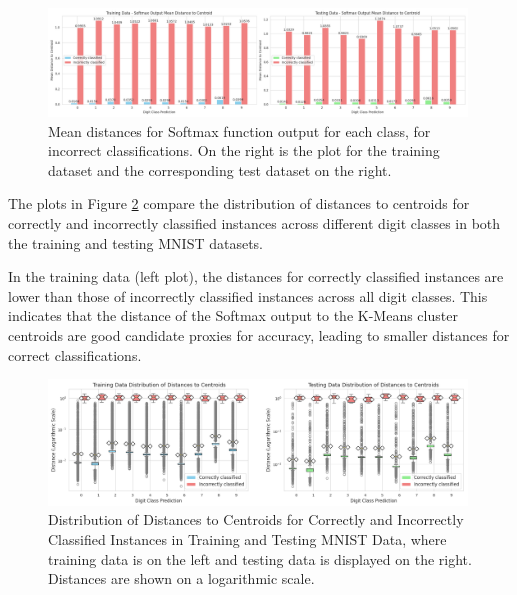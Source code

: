\begin{figure}[h]
    \centering
    \includegraphics[width=0.99\textwidth]{Figures/Methods/MNIST_Correct_and_Incorrect_Training_and_Testing_Mean_Distance_To_Centroids.png}
    \caption{Mean distances for Softmax function output for each class, for incorrect classifications. On the right is the plot for the training dataset and the corresponding test dataset on the right.}
    \label{fig:MNIST_Correct_and_Incorrect_Training_and_Testing_Mean_Distance_To_Centroids}
\end{figure}

The plots in Figure \ref{fig:boxplots_side_by_side_x2} compare the distribution of distances to centroids for correctly and incorrectly classified instances across different digit classes in both the training and testing MNIST datasets.

In the training data (left plot), the distances for correctly classified instances are lower than those of incorrectly classified instances across all digit classes. This indicates that the distance of the Softmax output to the K-Means cluster centroids are good candidate proxies for accuracy, leading to smaller distances for correct classifications.

\begin{figure}[h]
    \centering
    \includegraphics[width=0.99\textwidth]{Figures/Methods/boxplots_side_by_side_x2.png}
    \caption{Distribution of Distances to Centroids for Correctly and Incorrectly Classified Instances in Training and Testing MNIST Data, where training data is on the left and testing data is displayed on the right. Distances are shown on a logarithmic scale.}
    \label{fig:boxplots_side_by_side_x2}
\end{figure}


